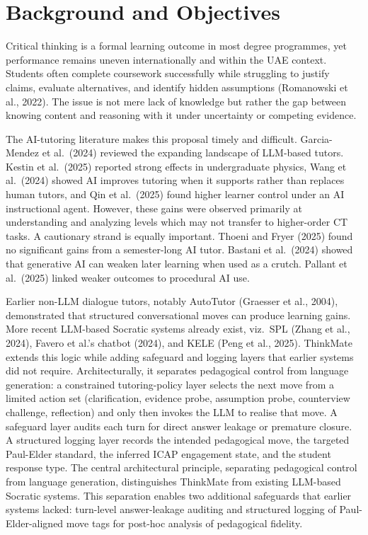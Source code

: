 \documentclass[11pt,a4paper]{article}
\begin{document}
\section{Background and Objectives}

Critical thinking is a formal learning outcome in most degree programmes, yet performance remains uneven internationally and within the UAE context. Students often complete coursework successfully while struggling to justify claims, evaluate alternatives, and identify hidden assumptions (Romanowski et al., 2022). The issue is not mere lack of knowledge but rather the gap between knowing content and reasoning with it under uncertainty or competing evidence.

The AI-tutoring literature makes this proposal timely and difficult. Garcia-Mendez et al.\ (2024) reviewed the expanding landscape of LLM-based tutors. Kestin et al.\ (2025) reported strong effects in undergraduate physics, Wang et al.\ (2024) showed AI improves tutoring when it supports rather than replaces human tutors, and Qin et al.\ (2025) found higher learner control under an AI instructional agent. However, these gains were observed primarily at understanding and analyzing levels which may not transfer to higher-order CT tasks. A cautionary strand is equally important. Thoeni and Fryer (2025) found no significant gains from a semester-long AI tutor. Bastani et al.\ (2024) showed that generative AI can weaken later learning when used as a crutch. Pallant et al.\ (2025) linked weaker outcomes to procedural AI use.

Earlier non-LLM dialogue tutors, notably AutoTutor (Graesser et al., 2004), demonstrated that structured conversational moves can produce learning gains. More recent LLM-based Socratic systems already exist, viz.\ SPL (Zhang et al., 2024), Favero et al.'s chatbot (2024), and KELE (Peng et al., 2025). ThinkMate extends this logic while adding safeguard and logging layers that earlier systems did not require. Architecturally, it separates pedagogical control from language generation: a constrained tutoring-policy layer selects the next move from a limited action set (clarification, evidence probe, assumption probe, counterview challenge, reflection) and only then invokes the LLM to realise that move. A safeguard layer audits each turn for direct answer leakage or premature closure. A structured logging layer records the intended pedagogical move, the targeted Paul-Elder standard, the inferred ICAP engagement state, and the student response type. The central architectural principle, separating pedagogical control from language generation, distinguishes ThinkMate from existing LLM-based Socratic systems. This separation enables two additional safeguards that earlier systems lacked: turn-level answer-leakage auditing and structured logging of Paul-Elder-aligned move tags for post-hoc analysis of pedagogical fidelity.
\end{document}
